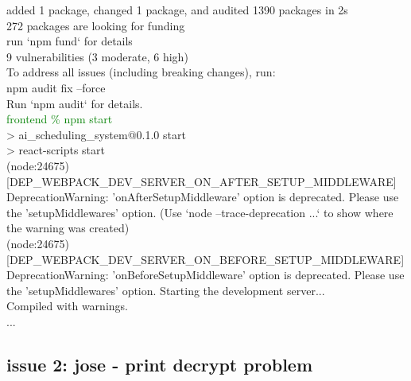 \documentclass[12pt, a4paper]{article}
\begin{document}
\begin{monoblock}
            added 1 package, changed 1 package, and audited 1390 packages in 2s \\
            
            272 packages are looking for funding \\
              run `npm fund` for details \\
            
            9 vulnerabilities (3 moderate, 6 high) \\
            
            To address all issues (including breaking changes), run: \\
              npm audit fix --force \\
            
            Run `npm audit` for details. \\
        
            \textcolor{green}{frontend \% npm start} \\
            
            > ai\_scheduling\_system@0.1.0 start \\
            > react-scripts start \\
            
            (node:24675) [DEP\_WEBPACK\_DEV\_SERVER\_ON\_AFTER\_SETUP\_MIDDLEWARE] DeprecationWarning: 'onAfterSetupMiddleware' option is deprecated. Please use the 'setupMiddlewares' option.
            (Use `node --trace-deprecation ...` to show where the warning was created) \\
            (node:24675) [DEP\_WEBPACK\_DEV\_SERVER\_ON\_BEFORE\_SETUP\_MIDDLEWARE] DeprecationWarning: 'onBeforeSetupMiddleware' option is deprecated. Please use the 'setupMiddlewares' option.
            Starting the development server... \\
            
            Compiled with warnings. \\
            
            ...
        \end{monoblock}
    
    \subsection{issue 2: jose - print decrypt problem}
    
\end{document}
